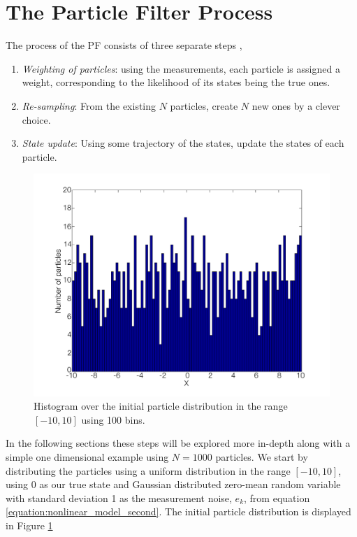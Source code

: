 \documentclass{LTHthesis}
\begin{document}
\section{The Particle Filter Process}
\label{sec:PF_process}
%
The process of the PF consists of three separate steps \cite{gson12}, 
\begin{enumerate}
\item \emph{Weighting of particles}: using the measurements, each particle is assigned a weight, corresponding to the likelihood of its states being the true ones.
\item \emph{Re-sampling}: From the existing $N$ particles, create $N$ new ones by a clever choice.
\item \emph{State update}: Using some trajectory of the states, update the states of each particle.
\end{enumerate}
%
\begin{figure}[!hbt]

\includegraphics[width=1\textwidth ]{images/PF/hist_ini_dist}
\caption{Histogram over the initial particle distribution in the range $[-10,10]$ using 100 bins.}\label{hist_ini_dist}
\end{figure}
%
In the following sections these steps will be explored more in-depth along with a simple one dimensional example using $N=1000$ particles. We start by distributing the particles using a uniform distribution in the range $[-10,10]$, using $0$ as our true state and Gaussian distributed zero-mean random variable with standard deviation 1 as the measurement noise, $e_k$, from equation \ref{equation:nonlinear_model_second}. The initial particle distribution is displayed in Figure  \ref{hist_ini_dist}
%
\end{document}
